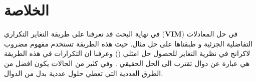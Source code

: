 \chapter*{الخلاصة}

في نهاية البحث قد تعرفنا على طريقة التغاير التكراري  (\textbf{VIM}) في حل المعادلات التفاضلية الجزئية و طبقناها على حل مثال. حيث هذه الطريقة تستخدم مفهوم مضروب لاكرانج في نظرية التغاير للحصول حل امثلي ()
 وعرفنا ان التكرارات في هذه الطريقة هي عبارة عن دوال تقترب الى الحل الحقيقي
 . وفي كثير من الحالات يكون افضل من الطرق العددية التي تعطي حلول عددية بدل من الدوال.